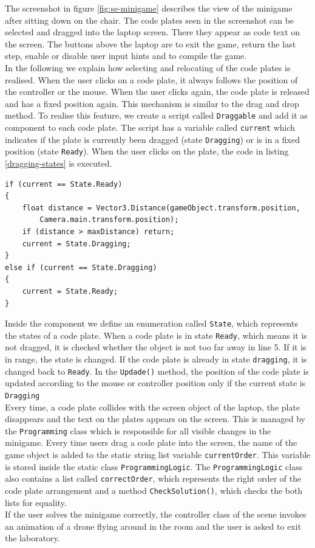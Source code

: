 The screenshot in figure \ref{fig:se-minigame} describes the view of the minigame after sitting down on the chair. The code plates seen in the screenshot can be selected and dragged into the laptop screen. There they appear as code text on the screen. The buttons above the laptop are to exit the game, return the last step, enable or disable user input hints and to compile the game. \\
In the following we explain how selecting and relocating of the code plates is realised.
When the user clicks on a code plate, it always follows the position of the controller or the mouse. When the user clicks again, the code plate is released and has a fixed position again. This mechanism is similar to the drag and drop method. To realise this feature, we create a script called \texttt{Draggable} and add it as component to each code plate. The script has a variable called \texttt{current} which indicates if the plate is currently been dragged (state \texttt{Dragging}) or is in a fixed position (state \texttt{Ready}). When the user clicks on the plate, the code in listing \ref{dragging-states} is executed.
 \newpage
\begin{lstlisting} 
if (current == State.Ready)
{   
    float distance = Vector3.Distance(gameObject.transform.position,
        Camera.main.transform.position);
    if (distance > maxDistance) return;
    current = State.Dragging;
}
else if (current == State.Dragging)
{
    current = State.Ready;
}
\end{lstlisting}
\label{dragging-states}
\vspace{1cm}
Inside the component we define an enumeration called \texttt{State}, which represents the states of a code plate. When a code plate is in state \texttt{Ready}, which means it is not dragged, it is checked whether the object is not too far away in line 5. If it is in range, the state is changed. If the code plate is already in state \texttt{dragging}, it is changed back to \texttt{Ready}. In the \texttt{Updade()} method, the position of the code plate is updated according to the mouse or controller position only if the current state is \texttt{Dragging}\\
Every time, a code plate collides with the screen object of the laptop, the plate disappears and the text on the plates appears on the screen. This is managed by the \texttt{Programming} class which is responsible for all visible changes in the minigame. Every time users drag a code plate into the screen, the name of the game object is added to the static string list variable \texttt{currentOrder}. This variable is stored inside the static class \texttt{ProgrammingLogic}. The \texttt{ProgrammingLogic} class also contains a list called \texttt{correctOrder}, which represents the right order of the code plate arrangement and a method \texttt{CheckSolution()}, which checks the both lists for equality.\\
If the user solves the minigame correctly, the controller class of the scene invokes an animation of a drone flying around in the room and the user is asked to exit the laboratory.

